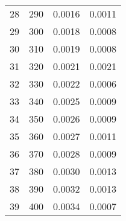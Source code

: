 \begin{table}
\begin{adjustbox}{width=1\textwidth/2}
\begin{tabular}{|c|c|c|c|}
\cline{1-4}
28 & 290 & 0.0016 & 0.0011 \\
\cline{1-4}
29 & 300 & 0.0018 & 0.0008 \\
\cline{1-4}
30 & 310 & 0.0019 & 0.0008 \\
\cline{1-4}
31 & 320 & 0.0021 & 0.0021 \\
\cline{1-4}
32 & 330 & 0.0022 & 0.0006 \\
\cline{1-4}
33 & 340 & 0.0025 & 0.0009 \\
\cline{1-4}
34 & 350 & 0.0026 & 0.0009 \\
\cline{1-4}
35 & 360 & 0.0027 & 0.0011 \\
\cline{1-4}
36 & 370 & 0.0028 & 0.0009 \\
\cline{1-4}
37 & 380 & 0.0030 & 0.0013 \\
\cline{1-4}
38 & 390 & 0.0032 & 0.0013 \\
\cline{1-4}
39 & 400 & 0.0034 & 0.0007 \\
\cline{1-4}
\end{tabular}
\end{adjustbox}
\end{table}

